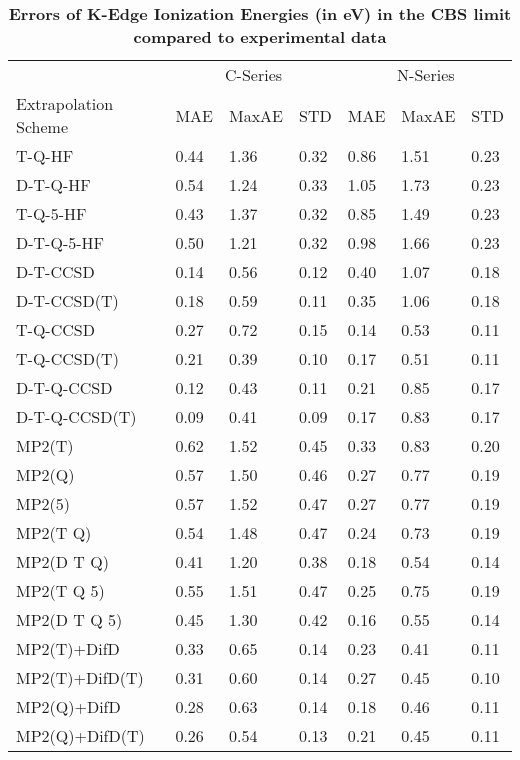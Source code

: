 \begin{table}
  \caption{\textbf{Errors of K-Edge Ionization Energies (in eV) in the CBS limit compared to experimental data}}
  \label{tbl:cn-series-wide}
  \begin{tabular}{l l l l l l l }
    \hline
     & \multicolumn{3}{c}{C-Series} & \multicolumn{3}{c}{N-Series} \\ 
    Extrapolation Scheme & MAE & MaxAE & STD & MAE & MaxAE & STD \\ 
    \hline
    T-Q-HF & 0.44 & 1.36 & 0.32 & 0.86 & 1.51 & 0.23 \\ 
    D-T-Q-HF & 0.54 & 1.24 & 0.33 & 1.05 & 1.73 & 0.23 \\ 
    T-Q-5-HF & 0.43 & 1.37 & 0.32 & 0.85 & 1.49 & 0.23 \\ 
    D-T-Q-5-HF & 0.50 & 1.21 & 0.32 & 0.98 & 1.66 & 0.23 \\ 
    D-T-CCSD & 0.14 & 0.56 & 0.12 & 0.40 & 1.07 & 0.18 \\ 
    D-T-CCSD(T) & 0.18 & 0.59 & 0.11 & 0.35 & 1.06 & 0.18 \\ 
    T-Q-CCSD & 0.27 & 0.72 & 0.15 & 0.14 & 0.53 & 0.11 \\ 
    T-Q-CCSD(T) & 0.21 & 0.39 & 0.10 & 0.17 & 0.51 & 0.11 \\ 
    D-T-Q-CCSD & 0.12 & 0.43 & 0.11 & 0.21 & 0.85 & 0.17 \\ 
    D-T-Q-CCSD(T) & 0.09 & 0.41 & 0.09 & 0.17 & 0.83 & 0.17 \\ 
    MP2(T) & 0.62 & 1.52 & 0.45 & 0.33 & 0.83 & 0.20 \\ 
    MP2(Q) & 0.57 & 1.50 & 0.46 & 0.27 & 0.77 & 0.19 \\ 
    MP2(5) & 0.57 & 1.52 & 0.47 & 0.27 & 0.77 & 0.19 \\ 
    MP2(T Q) & 0.54 & 1.48 & 0.47 & 0.24 & 0.73 & 0.19 \\ 
    MP2(D T Q) & 0.41 & 1.20 & 0.38 & 0.18 & 0.54 & 0.14 \\ 
    MP2(T Q 5) & 0.55 & 1.51 & 0.47 & 0.25 & 0.75 & 0.19 \\ 
    MP2(D T Q 5) & 0.45 & 1.30 & 0.42 & 0.16 & 0.55 & 0.14 \\ 
    MP2(T)+DifD & 0.33 & 0.65 & 0.14 & 0.23 & 0.41 & 0.11 \\ 
    MP2(T)+DifD(T) & 0.31 & 0.60 & 0.14 & 0.27 & 0.45 & 0.10 \\ 
    MP2(Q)+DifD & 0.28 & 0.63 & 0.14 & 0.18 & 0.46 & 0.11 \\ 
    MP2(Q)+DifD(T) & 0.26 & 0.54 & 0.13 & 0.21 & 0.45 & 0.11 \\ 

\end{tabular}
\end{table}

